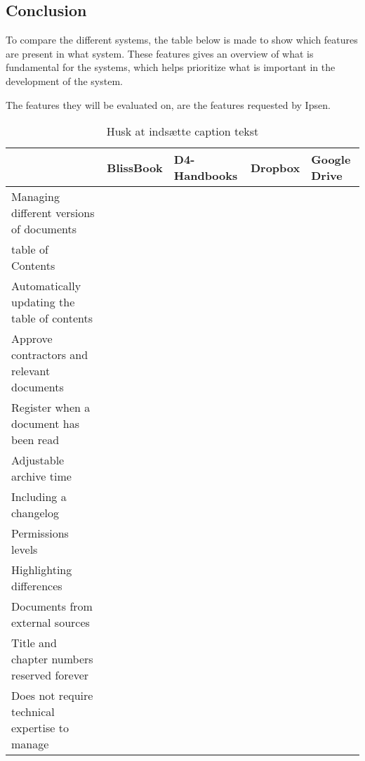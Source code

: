 \subsection{Conclusion}
To compare the different systems, the table below is made to show which features are present in what system. These features gives an overview of what is fundamental for the systems, which helps prioritize what is important in the development of the system.

The features they will be evaluated on, are the features requested by Ipsen.

\begin{table}[H]
	\begin{center}
		\begin{tabular}{| m{5cm}|m{1.6cm}|m{2cm}|m{1.5cm}|m{1.2cm}|}
			\hline
			 & BlissBook  & D4-Handbooks & Dropbox & Google \newline Drive \\
			\hline
			Managing different versions of documents & \checkmark &  &  & \\
			\hline
			table of Contents & \checkmark & \checkmark  & \checkmark & \checkmark \\
			\hline
			Automatically updating the table of contents & \checkmark & \checkmark  & \checkmark & \checkmark \\
			\hline
			Approve contractors and \newline relevant documents &  &  &  & \\
			\hline
			Register when a document has been read & \checkmark & \checkmark &  & \\
			\hline
			Adjustable archive time &  &  &  & \\
			\hline
			Including a changelog & \checkmark & \checkmark  & \checkmark & \checkmark \\
			\hline
			Permissions levels & \checkmark &  &  & \\
			\hline
			Highlighting differences & \checkmark &  &  & \\
			\hline
			Documents from external \newline sources &  &  & \checkmark & \checkmark \\
			\hline
			Title and chapter numbers \newline reserved forever &  &  &  & \\
			\hline
			Does not require technical \newline expertise to manage & \checkmark & \checkmark  & \checkmark & \checkmark \\
			\hline
		\end{tabular}
	\caption{{\color{red} Husk at indsætte caption tekst}}\label{tab:Exsisting}
	\end{center}
\end{table}

